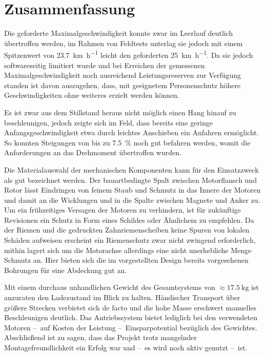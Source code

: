 \chapter{Zusammenfassung}
	Die geforderte Maximalgeschwindigkeit konnte zwar im Leerlauf deutlich übertroffen werden, im Rahmen von Feldtests unterlag sie jedoch mit einem Spitzenwert von \qty{23,7}{\kilo\metre\per\hour} leicht den geforderten \qty{25}{\kilo\metre\per\hour}.
	Da sie jedoch softwareseitig limitiert wurde und bei Erreichen der gemessenen Maximalgeschwindigkeit noch ausreichend Leistungsreserven zur Verfügung standen ist davon auszugehen, dass, mit geeignetem Personenschutz höhere Geschwindigkeiten ohne weiteres erzielt werden können.

	Es ist zwar aus dem Stillstand heraus nicht möglich einen Hang hinauf zu beschleunigen, jedoch zeigte sich im Feld, dass bereits eine geringe Anfangsgeschwindigkeit etwa durch leichtes Anschieben ein Anfahren ermöglicht.
	So konnten Steigungen von bis zu \qty{7,5}{\percent} noch gut befahren werden, womit die Anforderungen an das Drehmoment übertroffen wurden.\par\medskip
	Die Materialauswahl der mechanischen Komponenten kann für den Einsatzzweck als gut bezeichnet werden.
	Der bauartbedingte Spalt zwischen Motorflansch und Rotor lässt Eindringen von feinem Staub und Schmutz in das Innere der Motoren und damit an die Wicklungen und in die Spalte zwischen Magnete und Anker zu.
	Um ein frühzeitiges Versagen der Motoren zu verhindern, ist für zukünftige Revisionen ein Schutz in Form eines Schildes oder Ähnlichem zu empfehlen.
	Da der Riemen und die gedruckten Zahnriemenscheiben keine Spuren von lokalen Schäden aufweisen erscheint ein Riemenschutz zwar nicht zwingend erforderlich, mithin lagert sich um die Motorachse allerdings eine nicht unerhebliche Menge Schmutz an.
	Hier bieten sich die im vorgestellten Design bereits vorgesehenen Bohrungen für eine Abdeckung gut an.\par\medskip
	Mit einem durchaus unhandlichen Gewicht des Gesamtsystems von \(\approx \qty{17,5}{\kilo\gram}\) ist anzuraten den Ladezustand im Blick zu halten.
	Händischer Transport über größere Strecken verbietet sich de facto und die hohe Masse erschwert manuelles Beschleunigen deutlich.
	Das Antriebssystem bietet lediglich bei den verwendeten Motoren --~auf Kosten der Leistung --~Einsparpotential bezüglich des Gewichtes.
	Abschließend ist zu sagen, dass das Projekt trotz mangelnder Montagefreundlichkeit ein Erfolg war und --~es wird noch aktiv genutzt --~ist.